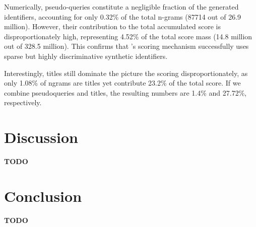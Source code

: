 Numerically, pseudo-queries constitute a negligible fraction of the generated identifiers, accounting for only 0.32\% of the total n-grams (87714 out of 26.9 million). However, their contribution to the total accumulated score is disproportionately high, representing 4.52\% of the total score mass (14.8 million out of 328.5 million). This confirms that 's scoring mechanism successfully uses sparse but highly discriminative synthetic identifiers. 

Interestingly, titles still dominate the picture the scoring disproportionately, as only 1.08\% of ngrams are titles yet contribute 23.2\% of the total score. If we combine pseudoqueries and titles, the resulting numbers are 1.4\% and 27.72\%, respectively.

\section{Discussion}

\textbf{TODO}

\section{Conclusion} %

\textbf{TODO}
